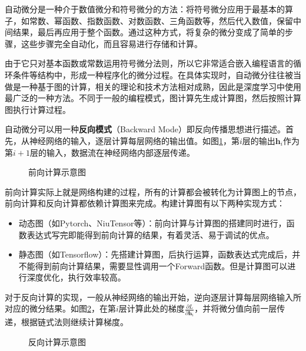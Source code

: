 \parinterval  自动微分是一种介于数值微分和符号微分的方法：将符号微分应用于最基本的算子，如常数、幂函数、指数函数、对数函数、三角函数等，然后代入数值，保留中间结果，最后再应用于整个函数。通过这种方式，将复杂的微分变成了简单的步骤，这些步骤完全自动化，而且容易进行存储和计算。

\parinterval  由于它只对基本函数或常数运用符号微分法则，所以它非常适合嵌入编程语言的循环条件等结构中，形成一种程序化的微分过程。在具体实现时，自动微分往往被当做是一种基于图的计算，相关的理论和技术方法相对成熟，因此是深度学习中使用最广泛的一种方法。不同于一般的编程模式，图计算先生成计算图，然后按照计算图执行计算过程。

\parinterval  自动微分可以用一种{\small\sffamily\bfseries{反向模式}}（Backward Mode）即反向传播思想进行描述。首先，从神经网络的输入，逐层计算每层网络的输出值。如图\ref{fig:5-44}，第$ i $层的输出$ \mathbf h_i $作为第$ i+1 $层的输入，数据流在神经网络内部逐层传递。

\begin{figure}[htp]
\centering

\caption{前向计算示意图}
\label{fig:5-44}
\end{figure}

\parinterval  前向计算实际上就是网络构建的过程，所有的计算都会被转化为计算图上的节点，前向计算和反向计算都依赖计算图来完成。构建计算图有以下两种实现方式：

\begin{itemize}
\vspace{0.5em}
\item 动态图（如Pytorch、NiuTensor等）：前向计算与计算图的搭建同时进行，函数表达式写完即能得到前向计算的结果，有着灵活、易于调试的优点。
\vspace{0.5em}
\item 静态图（如Tensorflow）：先搭建计算图，后执行运算，函数表达式完成后，并不能得到前向计算结果，需要显性调用一个Forward函数。但是计算图可以进行深度优化，执行效率较高。
\vspace{0.5em}
\end{itemize}

\parinterval  对于反向计算的实现，一般从神经网络的输出开始，逆向逐层计算每层网络输入所对应的微分结果。如图\ref{fig:5-45}，在第$ i $层计算此处的梯度$ \frac{\partial L}{\partial \mathbf h_i} $，并将微分值向前一层传递，根据链式法则继续计算梯度。

\begin{figure}[htp]
\centering

\caption{反向计算示意图}
\label{fig:5-45}
\end{figure}

